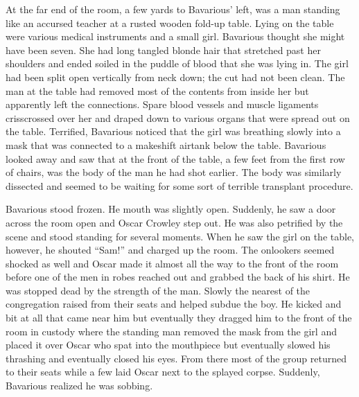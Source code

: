 At the far end of the room, a few yards to Bavarious' left,
was a man standing like an accursed teacher at a rusted wooden
fold-up table. Lying on the table were various medical instruments
and a small girl. Bavarious thought she might have been seven. She
had long tangled blonde hair that stretched past her shoulders and
ended soiled in the puddle of blood that she was lying in. The girl
had been split open vertically from neck down; the cut had not been
clean. The man at the table had removed most of the contents from
inside her but apparently left the connections. Spare blood vessels
and muscle ligaments crisscrossed over her and draped down to
various organs that were spread out on the table. Terrified,
Bavarious noticed that the girl was breathing slowly into a mask
that was connected to a makeshift airtank below the table.
Bavarious looked away and saw that at the front of the table, a few
feet from the first row of chairs, was the body of the man he had
shot earlier. The body was similarly dissected and seemed to be
waiting for some sort of terrible transplant procedure.



Bavarious stood frozen. He mouth was slightly open. Suddenly, he
saw a door across the room open and Oscar Crowley step out. He was
also petrified by the scene and stood standing for several moments.
When he saw the girl on the table, however, he shouted
``Sam!'' and charged up the room. The onlookers seemed
shocked as well and Oscar made it almost all the way to the front
of the room before one of the men in robes reached out and grabbed
the back of his shirt. He was stopped dead by the strength of the
man. Slowly the nearest of the congregation raised from their seats
and helped subdue the boy. He kicked and bit at all that came near
him but eventually they dragged him to the front of the room in
custody where the standing man removed the mask from the girl and
placed it over Oscar who spat into the mouthpiece but eventually
slowed his thrashing and eventually closed his eyes. From there
most of the group returned to their seats while a few laid Oscar
next to the splayed corpse. Suddenly, Bavarious realized he was
sobbing. 
 







